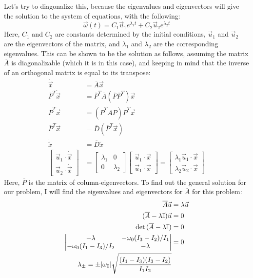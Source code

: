 \documentclass[10pt]{article}
\begin{document}
Let's try to diagonalize this, because the eigenvalues and eigenvectors 
will give the solution to the system of equations, with the following:
\begin{equation}
    \vec{\omega}(t) = C_1\vec{u}_1 e^{\lambda_1 t} 
        + C_2\vec{u}_2 e^{\lambda_2 t}
\end{equation}
Here, $C_1$ and $C_2$ are constants determined by the initial conditions, 
$\vec{u}_1$ and $\vec{u}_2$ are the eigenvectors of the matrix, and 
$\lambda_1$ and $\lambda_2$ are the corresponding eigenvalues. This can be 
shown to be the solution as follows, assuming the matrix $\overline{A}$ 
is diagonalizable (which it is in this case), and keeping in mind 
that the inverse of an orthogonal matrix is equal to its transpose:
\begin{align*}
    \dot{\vec{x}} &= \overline{A}\vec{x} \\
    \overline{P}^T\dot{\vec{x}} &= \overline{P}^T\overline{A}
        (\overline{P}\overline{P}^T)\vec{x} \\
    \overline{P}^T\dot{\vec{x}} &= (\overline{P}^T\overline{A}
        \overline{P})\overline{P}^T\vec{x} \\
    \overline{P}^T\dot{\vec{x}} &= \overline{D}(\overline{P}^T\vec{x}) \\
    \dot{\tilde{x}} &= \overline{D}\tilde{x} \\
    \begin{bmatrix}
        \vec{u}_1\cdot\dot{\vec{x}} \\
        \vec{u}_2\cdot\dot{\vec{x}}
    \end{bmatrix}
    &=
    \begin{bmatrix}
        \lambda_1 & 0 \\
        0 & \lambda_2
    \end{bmatrix}
    \begin{bmatrix}
        \vec{u}_1\cdot\vec{x} \\
        \vec{u}_1\cdot\vec{x}
    \end{bmatrix}
    = 
    \begin{bmatrix}
        \lambda_1\vec{u}_1\cdot\vec{x} \\
        \lambda_2\vec{u}_2\cdot\vec{x}
    \end{bmatrix}
\end{align*}
Here, $\overline{P}$ is the matrix of column-eigenvectors. To find out 
the general solution for our problem, I will find the eigenvalues and 
eigenvectors for $\overline{A}$ for this problem:
\begin{align}
    \overline{A}\vec{u} &= \lambda\vec{u} \notag\\
    (\overline{A} - \lambda\mathbb{I})\vec{u} &= 0\notag\\
    \det{(\overline{A} - \lambda\mathbb{I})} &= 0 \notag\\
    \begin{vmatrix}
        -\lambda & -\omega_0(I_3 - I_2)/I_1 \\
        -\omega_0(I_1 - I_3)/I_2 & -\lambda 
    \end{vmatrix}
    &= 0 \notag\\
    \lambda_\pm = \pm|\omega_0|\sqrt{\frac{(I_1-I_3)(I_3-I_2)}{I_1I_2}}
\end{align}
\end{document}
